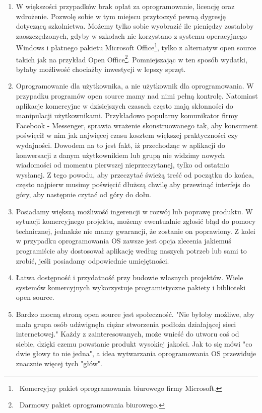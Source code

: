 \documentclass{article}
\begin{document}
\begin{enumerate}
    \item W większości przypadków brak opłat za oprogramowanie, licencję oraz wdrożenie. Pozwolę sobie w tym miejscu przytoczyć pewną dygresję dotyczącą szkolnictwa. Możemy tylko sobie wyobrazić ile pieniędzy zostałoby zaoszczędzonych, gdyby w szkołach nie korzystano z systemu operacyjnego Windows i płatnego pakietu Microsoft Office\footnote{\, Komercyjny pakiet oprogramowania biurowego firmy Microsoft.}, tylko z alternatyw open source takich jak na przykład Open Office\footnote{\, Darmowy pakiet oprogramowania biurowego.}. Pomniejszając w ten sposób wydatki, byłaby możliwość chociażby inwestycji w lepszy sprzęt.
    
    \item Oprogramowanie dla użytkownika, a nie użytkownik dla oprogramowania. W przypadku programów open source mamy nad nimi pełną kontrolę. Natomiast aplikacje komercyjne w dzisiejszych czasach często mają skłonności do manipulacji użytkownikami. Przykładowo popularny komunikator firmy Facebook - Messenger, sprawia wrażenie skonstruowanego tak, aby konsument poświęcił w nim jak najwięcej czasu kosztem większej praktyczności czy wydajności. Dowodem na to jest fakt, iż przechodząc w aplikacji do konwersacji z danym użytkownikiem lub grupą nie widzimy nowych wiadomości od momentu pierwszej nieprzeczytanej, tylko od ostatnio wysłanej. Z tego powodu, aby przeczytać świeżą treść od początku do końca, często najpierw musimy poświęcić dłuższą chwilę aby przewinąć interfejs do góry, aby następnie czytać od góry do dołu.
    
    \item Posiadamy większą możliwość ingerencji w rozwój lub poprawę produktu. W sytuacji komercyjnego projektu, możemy ewentualnie zgłosić błąd do pomocy technicznej, jednakże nie mamy gwarancji, że zostanie on poprawiony. Z kolei w przypadku oprogramowania OS zawsze jest opcja zlecenia jakiemuś programiście aby dostosował aplikację według naszych potrzeb lub sami to zrobić, jeśli posiadamy odpowiednie umiejętności.
    
    \item Łatwa dostępność i przydatność przy budowie własnych projektów. Wiele systemów komercyjnych wykorzystuje programistyczne pakiety i biblioteki open source.
    
    \item Bardzo mocną stroną open source jest społeczność. "Nie byłoby możliwe, aby mała grupa osób udźwignęła ciężar stworzenia podłoża działającej sieci internetowej\cite{Kotula}." Każdy z zainteresowanych, może wnieść do utworu coś od siebie, dzięki czemu powstanie produkt wysokiej jakości. Jak to się mówi "co dwie głowy to nie jedna", a idea wytwarzania oprogramowania OS przewiduje znacznie więcej tych "głów".
    

\end{enumerate}
\end{document}
